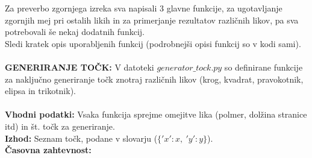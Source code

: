 \documentclass[a4paper]{report}
\begin{document}
Za preverbo zgornjega izreka sva napisali 3 glavne funkcije, za ugotavljanje zgornjih mej pri ostalih likih in za primerjanje rezultatov različnih likov, pa sva potrebovali še nekaj dodatnih funkcij. \\
Sledi kratek opis uporabljenih funkcij (podrobnejši opisi funkcij so v kodi sami). \\ \\
\textbf{GENERIRANJE TOČK: } V datoteki \colorbox{gray!10}{$generator\_tock.py$} so definirane funkcije za naključno generiranje točk znotraj različnih likov (krog, kvadrat, pravokotnik, elipsa in trikotnik). \\ \\
\textbf{Vhodni podatki:} Vsaka funkcija sprejme omejitve lika (polmer, dolžina stranice itd) in št. točk za generiranje. \\ 
\textbf{Izhod:} Seznam točk, podane v slovarju ($\{'x' : x, \ 'y' :  y\}$).  \\ 
\textbf{Časovna zahtevnost:} \\ \\
\end{document}
